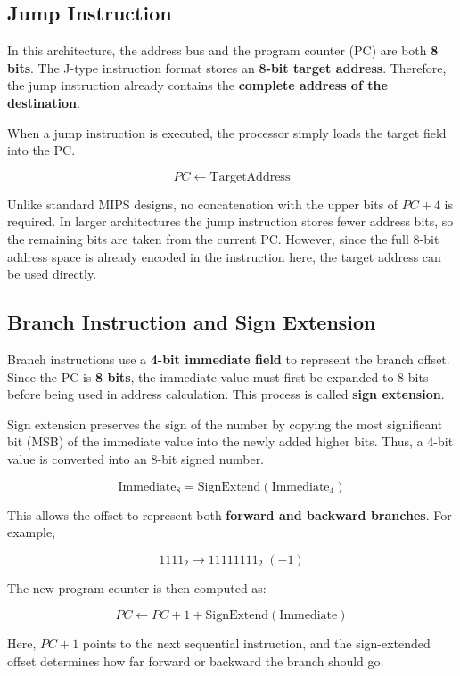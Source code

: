 \documentclass{article}
\begin{document}
\subsection*{Jump Instruction}

In this architecture, the address bus and the program counter (PC) are both \textbf{8 bits}. 
The J-type instruction format stores an \textbf{8-bit target address}. Therefore, the jump 
instruction already contains the \textbf{complete address of the destination}. 

When a jump instruction is executed, the processor simply loads the target field into the PC.

\[
PC \leftarrow \text{TargetAddress}
\]

Unlike standard MIPS designs, no concatenation with the upper bits of $PC+4$ is required. 
In larger architectures the jump instruction stores fewer address bits, so the remaining 
bits are taken from the current PC. However, since the full 8-bit address space is already 
encoded in the instruction here, the target address can be used directly.

\bigskip

\subsection*{Branch Instruction and Sign Extension}

Branch instructions use a \textbf{4-bit immediate field} to represent the branch offset. 
Since the PC is \textbf{8 bits}, the immediate value must first be expanded to 8 bits before 
being used in address calculation. This process is called \textbf{sign extension}.

Sign extension preserves the sign of the number by copying the most significant bit (MSB) 
of the immediate value into the newly added higher bits. Thus, a 4-bit value is converted 
into an 8-bit signed number.

\[
\text{Immediate}_{8} = \text{SignExtend}(\text{Immediate}_{4})
\]

This allows the offset to represent both \textbf{forward and backward branches}. For example,

\[
1111_2 \rightarrow 11111111_2 \; (-1)
\]

The new program counter is then computed as:

\[
PC \leftarrow PC + 1 + \text{SignExtend}(\text{Immediate})
\]

Here, $PC+1$ points to the next sequential instruction, and the sign-extended offset 
determines how far forward or backward the branch should go.
\end{document}
